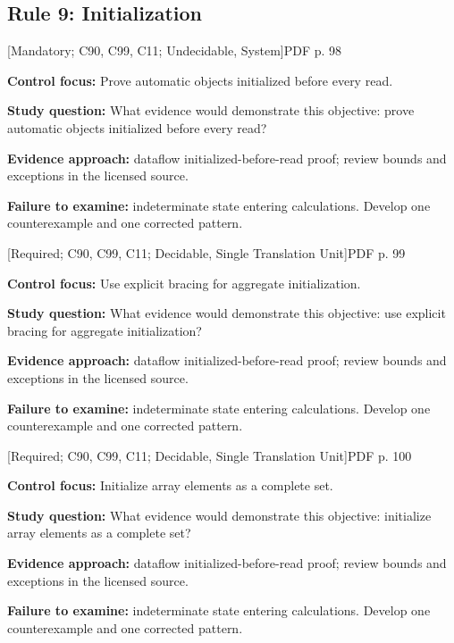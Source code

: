 \documentclass[10pt,letterpaper]{article}
\begin{document}
\subsection{Rule 9: Initialization}
 \textsf{\footnotesize [Mandatory; C90, C99, C11; Undecidable, System]}\hfill{\footnotesize PDF p. 98}\par
\textbf{Control focus:} Prove automatic objects initialized before every read.\par
\textbf{Study question:} What evidence would demonstrate this objective: prove automatic objects initialized before every read?\par
\textbf{Evidence approach:} dataflow initialized-before-read proof; review bounds and exceptions in the licensed source.\par
\textbf{Failure to examine:} indeterminate state entering calculations. Develop one counterexample and one corrected pattern.\par
\smallskip
{}
 \textsf{\footnotesize [Required; C90, C99, C11; Decidable, Single Translation Unit]}\hfill{\footnotesize PDF p. 99}\par
\textbf{Control focus:} Use explicit bracing for aggregate initialization.\par
\textbf{Study question:} What evidence would demonstrate this objective: use explicit bracing for aggregate initialization?\par
\textbf{Evidence approach:} dataflow initialized-before-read proof; review bounds and exceptions in the licensed source.\par
\textbf{Failure to examine:} indeterminate state entering calculations. Develop one counterexample and one corrected pattern.\par
\smallskip
{}
 \textsf{\footnotesize [Required; C90, C99, C11; Decidable, Single Translation Unit]}\hfill{\footnotesize PDF p. 100}\par
\textbf{Control focus:} Initialize array elements as a complete set.\par
\textbf{Study question:} What evidence would demonstrate this objective: initialize array elements as a complete set?\par
\textbf{Evidence approach:} dataflow initialized-before-read proof; review bounds and exceptions in the licensed source.\par
\textbf{Failure to examine:} indeterminate state entering calculations. Develop one counterexample and one corrected pattern.\par
\end{document}
